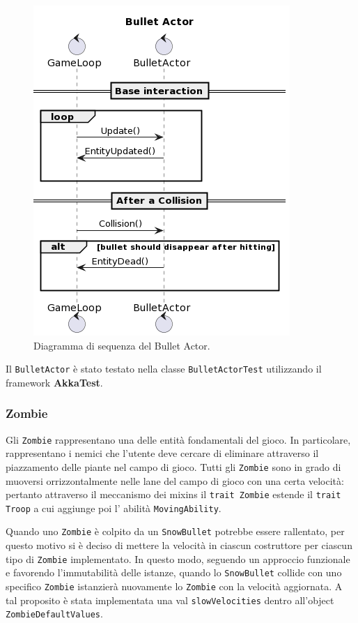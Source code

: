 \begin{figure}[H]
    \centering
    \includegraphics[width=0.8\linewidth]{images/bullet-actor.png}
    \caption{Diagramma di sequenza del Bullet Actor.}
\end{figure}

Il \texttt{BulletActor} è stato testato nella classe \texttt{BulletActorTest} utilizzando il framework \textbf{AkkaTest}.

\subsubsection{Zombie}
Gli \texttt{Zombie} rappresentano una delle entità fondamentali del gioco. In particolare, rappresentano i nemici che l'utente
deve cercare di eliminare attraverso il piazzamento delle piante nel campo di gioco.
Tutti gli \texttt{Zombie} sono in grado di muoversi orrizzontalmente nelle lane del campo di gioco con una certa velocità: pertanto
attraverso il meccanismo dei mixins il \texttt{trait Zombie} estende il \texttt{trait Troop} a cui aggiunge poi l' abilità \texttt{MovingAbility}.

Quando uno \texttt{Zombie} è colpito da un \texttt{SnowBullet} potrebbe essere rallentato, per questo motivo si è deciso di
mettere la velocità in ciascun costruttore per ciascun tipo di \texttt{Zombie} implementato.
In questo modo, seguendo un approccio funzionale e favorendo l'immutabilità delle istanze, quando lo \texttt{SnowBullet} collide con uno specifico \texttt{Zombie}
istanzierà nuovamente lo \texttt{Zombie} con la velocità aggiornata.
A tal proposito è stata implementata una val \texttt{slowVelocities} dentro all'object \texttt{ZombieDefaultValues}.

